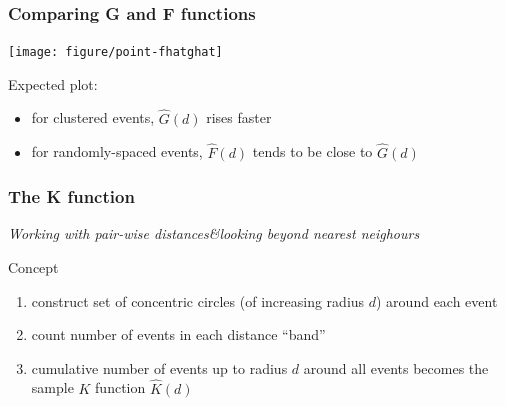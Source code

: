 \documentclass[10pt]{beamer}\usepackage[]{graphicx}\usepackage[]{color}
\newcommand{\bfigure}{\begin{figure}}
\newcommand{\efigure}{\end{figure}}
\newcommand{\bitemize}{\begin{itemize}}
\newcommand{\eitemize}{\end{itemize}}
\newcommand{\benumer}{\begin{enumerate}}
\newcommand{\eenumer}{\end{enumerate}}
\newcommand{\bblock}{\begin{block}}
\newcommand{\eblock}{\end{block}}
\begin{document}
\begin{frame}
\frametitle{Comparing G and F functions}



{\centering \texttt{[image: figure/point-fhatghat]} 

}




\bblock{Expected plot: }
\bitemize
\item for clustered events, $\hat{G}(d)$ rises faster
\item for randomly-spaced events, $\hat{F}(d)$ tends to be close to $\hat{G}(d)$  
 
\eitemize
\eblock
\end{frame}


\begin{frame}
\frametitle{The K function}
{\it \small Working with pair-wise distances\&looking beyond nearest neighours}
\bblock{Concept}
\benumer
\item construct set of concentric circles (of increasing radius $d$) around
each event
\item count number of events in each distance ``band''
\item cumulative number of events up to radius $d$ around all events
becomes the sample $K$ function $\hat{K}(d)$ 
\eenumer
\bfigure
{}
\efigure

\eblock
\end{frame}
\end{document}
